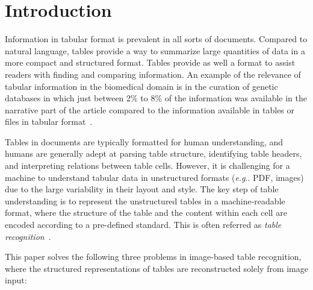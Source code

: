 \documentclass[conference]{IEEEtran}
\makeatletter
\DeclareRobustCommand\onedot{\futurelet\@let@token\@onedot}
\def\@onedot{\ifx\@let@token.\else.\null\fi\xspace}
\def\eg{\emph{e.g}\onedot} \def\Eg{\emph{E.g}\onedot}
\makeatother
\begin{document}
\section{Introduction}



Information in tabular format is prevalent in all sorts of documents. Compared
to natural language, tables provide a way to summarize large quantities of data
in a more compact and structured format. Tables provide as well a format to
assist readers with finding and comparing information. An example of the
relevance of tabular information in the biomedical domain is in the curation of
genetic databases in which just between 2\% to 8\% of the information was
available in the narrative part of the article compared to the information
available in tables or files in tabular format~\cite{jimeno2014literature}.

Tables in documents are typically formatted for human understanding, and humans
are generally adept at parsing table structure, identifying table headers, and
interpreting relations between table cells. However, it is challenging for a
machine to understand tabular data in unstructured formats (\eg PDF, images) due
to the large variability in their layout and style. The key step of table understanding is to represent the unstructured tables in a machine-readable format, where the structure of the table and the content within each cell are encoded according to a pre-defined standard. This is often referred as \emph{table recognition}~\cite{gobel2013icdar}.

This paper solves the following three problems in image-based table recognition,
where the structured representations of tables are reconstructed solely from
image input:
\end{document}
